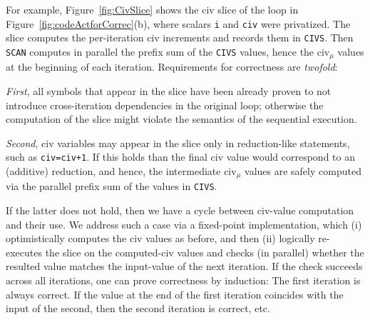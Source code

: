 \documentclass{sig-alternate}
\begin{document}
For example, Figure~\ref{fig:CivSlice} shows the {\sc civ} slice of the loop
in Figure~\ref{fig:codeActforCorrec}(b), where scalars {\tt i} and {\tt civ}
were privatized. The slice computes the per-iteration {\sc civ} increments 
and records them in {\tt CIVS}. Then {\tt SCAN}
computes in parallel the prefix sum of the {\tt CIVS} values, 
hence the {\sc civ}$_\mu$ values at the beginning of each iteration. 
%
Requirements for correctness are {\em twofold}:  

{\em First}, all symbols that appear in the slice have been already proven 
to not introduce cross-iteration dependencies in the original loop; otherwise 
the computation of the slice might violate the semantics of the sequential execution. 

{\em Second}, {\sc civ} variables may appear in the slice only in reduction-like statements, 
such as {\tt civ=civ+1}.
If this holds than the final {\sc civ} value would correspond to an (additive) reduction, 
and hence, the intermediate {\sc civ}$_\mu$ values are safely computed via the parallel 
prefix sum of the values in {\tt CIVS}. 

If the latter does not hold, %
then we have a cycle between {\sc civ}-value computation and their use.   
We address such a case via a fixed-point implementation,
which (i) optimistically computes the {\sc civ} values as before, and then (ii) logically 
re-executes the slice on the computed-{\sc civ} values and checks (in parallel) 
whether the resulted value matches the input-value of the next iteration. 
%
If the check succeeds across all iterations, one can prove correctness by induction:
The first iteration is always correct. If the value at the end of the first iteration 
coincides with the input of the second, then the second iteration 
is correct, etc.%

\end{document}
